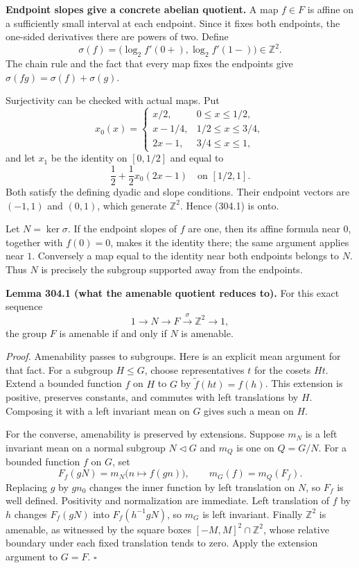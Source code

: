 \documentclass[11pt]{article}
\begin{document}
\textbf{Endpoint slopes give a concrete abelian quotient.} A map $f\in F$ is affine on a sufficiently small interval at each endpoint. Since it fixes both endpoints, the one-sided derivatives there are powers of two. Define
\[
 \sigma(f)=\bigl(\log_2 f'(0+),\log_2 f'(1-)\bigr)\in\mathbb Z^2.
 \tag{304.1}
\]
The chain rule and the fact that every map fixes the endpoints give $\sigma(fg)=\sigma(f)+\sigma(g)$.

Surjectivity can be checked with actual maps. Put
\[
 x_0(x)=
 \begin{cases}
 x/2,&0\leq x\leq1/2,\\
 x-1/4,&1/2\leq x\leq3/4,\\
 2x-1,&3/4\leq x\leq1,
 \end{cases}
\]
and let $x_1$ be the identity on $[0,1/2]$ and equal to
\[
 \frac12+\frac12 x_0(2x-1)
 \quad\text{on }[1/2,1].
\]
Both satisfy the defining dyadic and slope conditions. Their endpoint vectors are $(-1,1)$ and $(0,1)$, which generate $\mathbb Z^2$. Hence (304.1) is onto.

Let $N=\ker\sigma$. If the endpoint slopes of $f$ are one, then its affine formula near $0$, together with $f(0)=0$, makes it the identity there; the same argument applies near $1$. Conversely a map equal to the identity near both endpoints belongs to $N$. Thus $N$ is precisely the subgroup supported away from the endpoints.

\textbf{Lemma 304.1 (what the amenable quotient reduces to).} For this exact sequence
\[
 1\longrightarrow N\longrightarrow F\xrightarrow{\sigma}\mathbb Z^2
 \longrightarrow1,
\]
the group $F$ is amenable if and only if $N$ is amenable.

\emph{Proof.} Amenability passes to subgroups. Here is an explicit mean argument for that fact. For a subgroup $H\leq G$, choose representatives $t$ for the cosets $Ht$. Extend a bounded function $f$ on $H$ to $G$ by $\widetilde f(ht)=f(h)$. This extension is positive, preserves constants, and commutes with left translations by $H$. Composing it with a left invariant mean on $G$ gives such a mean on $H$.

For the converse, amenability is preserved by extensions. Suppose $m_N$ is a left invariant mean on a normal subgroup $N\lhd G$ and $m_Q$ is one on $Q=G/N$. For a bounded function $f$ on $G$, set
\[
 F_f(gN)=m_N\bigl(n\mapsto f(gn)\bigr),\qquad m_G(f)=m_Q(F_f).
\]
Replacing $g$ by $gn_0$ changes the inner function by left translation on $N$, so $F_f$ is well defined. Positivity and normalization are immediate. Left translation of $f$ by $h$ changes $F_f(gN)$ into $F_f(h^{-1}gN)$, so $m_G$ is left invariant. Finally $\mathbb Z^2$ is amenable, as witnessed by the square boxes $[-M,M]^2\cap\mathbb Z^2$, whose relative boundary under each fixed translation tends to zero. Apply the extension argument to $G=F$. $\square$
\end{document}
